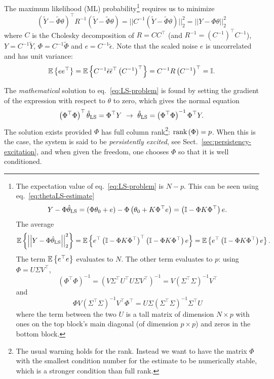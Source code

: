 The maximum likelihood (ML) probability\footnote{The expectation value of eq.~\eqref{eq:LS-problem} is $N-p$. This can be seen using eq.~\eqref{eq:thetaLS-estimate}
  \begin{equation*}
    Y-\Phi\hat{\theta}_\textrm{LS} = (\Phi\theta_0 + e) - \Phi\left(\theta_0 + K \Phi^\top e\right) = \left(\mathbb{I} - \Phi K \Phi^\top\right)e.
  \end{equation*}
  The average
  \begin{equation*}
    \mathbb{E}\left\{\left|\left|Y - \Phi \hat{\theta}_\textrm{LS}\right|\right|_2^2\right\} = \mathbb{E}\left\{e^\top\left(\mathbb{I} - \Phi K \Phi^\top\right)^\top\left(\mathbb{I} - \Phi K \Phi^\top\right)e\right\} = \mathbb{E}\left\{e^\top\left(\mathbb{I} - \Phi K \Phi^\top\right)e\right\}.
  \end{equation*}
  The term $\mathbb{E}\left\{e^\top e\right\}$ evaluates to $N$. The other term evaluates to $p$: using $\Phi = U\Sigma V^\top$,
  \begin{equation*}
    (\Phi^\top \Phi)^{-1} = \left(V\Sigma^\top U^\top U\Sigma V^\top\right)^{-1} = V\left(\Sigma^\top\Sigma\right)^{-1}V^\top
  \end{equation*}
  and
  \begin{equation*}
    \Phi V\left(\Sigma^\top\Sigma\right)^{-1}V^\top \Phi^\top = U\Sigma \left(\Sigma^\top\Sigma\right)^{-1}\Sigma^\top U
  \end{equation*}
where the term between the two $U$ is a tall matrix of dimension $N\times p$ with ones on the top block's main diagonal (of dimension $p\times p$) and zeros in the bottom block.} requires us to minimize
\begin{equation}
  \label{eq:LS-problem}
  (\tilde{Y} - \tilde{\Phi} \theta)^\top R^{-1} (\tilde{Y} - \tilde{\Phi} \theta) = ||C^{-1} (\tilde{Y} - \tilde{\Phi} \theta)||_2^2 = ||Y - \Phi \theta||_2^2
\end{equation}
where $C$ is the Cholesky decomposition of $R = C C^\top$ (and $R^{-1} = \left(C^{-1}\right)^\top C^{-1}$), $Y = C^{-1}\tilde{Y}$, $\Phi = C^{-1}\tilde{\Phi}$ and $e=C^{-1}\tilde{\epsilon}$. Note that the scaled noise $e$ is uncorrelated and has unit variance:
\begin{equation*}
  \mathbb{E}\left\{e e^\top\right\} = \mathbb{E}\left\{C^{-1}\tilde{\epsilon} \tilde{\epsilon}^\top \left(C^{-1}\right)^\top\right\} = C^{-1}R \left(C^{-1}\right)^\top = \mathbb{I}.
\end{equation*}

The \emph{mathematical} solution to eq.~\eqref{eq:LS-problem} is found by setting the gradient of the expression with respect to $\theta$ to zero, which gives the normal equation
\begin{equation}
  \label{eq:LS-estimator}
  \left(\Phi^\top\Phi\right)^\top \thetaLS = \Phi^\top Y\ \rightarrow\ \thetaLS = \left(\Phi^\top \Phi\right)^{-1} \Phi^\top Y.
\end{equation}
The solution exists provided $\Phi$ has full column rank\footnote{The usual warning holds for the rank. Instead we want to have the matrix $\Phi$ with the smallest condition number for the estimate to be numerically stable, which is a stronger condition than full rank.}: $\textrm{rank}\left(\Phi\right) = p$. When this is the case, the system is said to be \emph{persistently excited}, see Sect.~\ref{sec:persistency-excitation}, and when given the freedom, one chooses $\Phi$ so that it is well conditioned.


